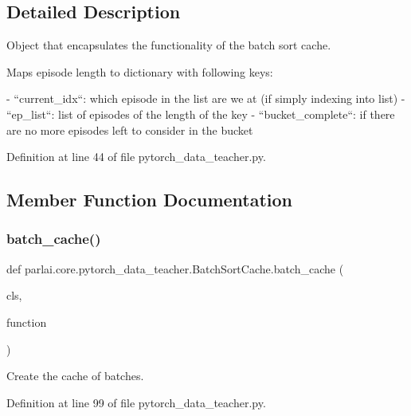 \subsection{Detailed Description}
\begin{DoxyVerb}Object that encapsulates the functionality of the batch sort cache.

Maps episode length to dictionary with following keys:

- ``current_idx``: which episode in the list are we at (if simply indexing
  into list)
- ``ep_list``: list of episodes of the length of the key
- ``bucket_complete``: if there are no more episodes left to consider in the
  bucket
\end{DoxyVerb}
 

Definition at line 44 of file pytorch\+\_\+data\+\_\+teacher.\+py.



\subsection{Member Function Documentation}
\mbox{\label{classparlai_1_1core_1_1pytorch__data__teacher_1_1BatchSortCache_ae97120b4fec464f79c7d0d9cd54c101d}} 
\subsubsection{\texorpdfstring{batch\+\_\+cache()}{batch\_cache()}}
{\footnotesize\ttfamily def parlai.\+core.\+pytorch\+\_\+data\+\_\+teacher.\+Batch\+Sort\+Cache.\+batch\+\_\+cache (\begin{DoxyParamCaption}\item[{}]{cls,  }\item[{}]{function }\end{DoxyParamCaption})}

\begin{DoxyVerb}Create the cache of batches.
\end{DoxyVerb}
 

Definition at line 99 of file pytorch\+\_\+data\+\_\+teacher.\+py.


